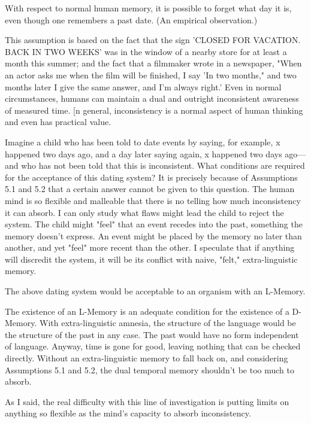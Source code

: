  With respect to normal human memory, it is possible 
to forget what day it is, even though one remembers a past date. (An 
empirical observation.) 

 This assumption is based on the fact that the sign 
'CLOSED FOR VACATION. BACK IN TWO WEEKS' was in the window of 
a nearby store for at least a month this summer; and the fact that a 
filmmaker wrote in a newspaper, "When an actor asks me when the film will 
be finished, I say 'In two months," and two months later I give the same 
answer, and I'm always right.' Even in normal circumstances, humans can 
maintain a dual and outright inconsistent awareness of measured time. [n 
general, inconsistency is a normal aspect of human thinking and even has 
practical value. 

Imagine a child who has been told to date events by saying, for 
example, x happened two days ago, and a day later saying again, x happened 
two days ago---and who has not been told that this is inconsistent. What 
conditions are required for the acceptance of this dating system? It is 
precisely because of Assumptions 5.1 and 5.2 that a certain answer cannot 
be given to this question. The human mind is so flexible and malleable that 
there is no telling how much inconsistency it can absorb. I can only study 
what flaws might lead the child to reject the system. The child might "feel" 
that an event recedes into the past, something the memory doesn't express. 
An event might be placed by the memory no later than another, and yet 
"feel" more recent than the other. I speculate that if anything will discredit 
the system, it will be its conflict with naive, "felt," extra-linguistic memory. 

 The above dating system would be acceptable to an 
organism with an L-Memory. 

 The existence of an L-Memory is an adequate condition 
for the existence of a D-Memory. With extra-linguistic amnesia, the 
structure of the language would be the structure of the past in any case. The 
past would have no form independent of language. Anyway, time is gone for 
good, leaving nothing that can be checked directly. Without an 
extra-linguistic memory to fall back on, and considering Assumptions 5.1 
and 5.2, the dual temporal memory shouldn't be too much to absorb. 

As I said, the real difficulty with this line of investigation is putting 
limits on anything so flexible as the mind's capacity to absorb inconsistency. 

